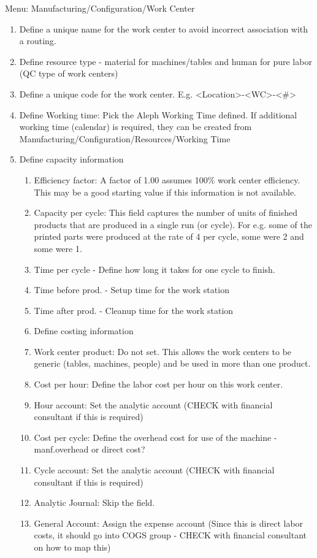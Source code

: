 Menu: Manufacturing/Configuration/Work Center

\begin{enumerate}
\item Define a unique name for the work center to avoid incorrect association with a routing.
\item Define resource type - material for machines/tables and human for pure labor (QC type of work centers)
\item Define a unique code for the work center. E.g. <Location>-<WC>-<\#>
\item Define Working time: Pick the Aleph Working Time defined. If additional working time (calendar) is required, they can be created from Manufacturing/Configuration/Resources/Working Time
\item Define capacity information
\begin{enumerate}
  \item Efficiency factor: A factor of 1.00 assumes 100\% work center efficiency. This may be a good starting value if this information is not available.
  \item Capacity per cycle: This field captures the number of units of finished products that are produced in a single run (or cycle). For e.g. some of the printed parts were produced at the rate of 4 per cycle, some were 2 and some were 1.
  \item Time per cycle - Define how long it takes for one cycle to finish.
  \item Time before prod. - Setup time for the work station
  \item Time after prod. - Cleanup time for the work station
  \item Define costing information
  \item Work center product: Do not set. This allows the work centers to be generic (tables, machines, people) and be used in more than one product.
  \item Cost per hour: Define the labor cost per hour on this work center. 
  \item  Hour account: Set the analytic account (CHECK with financial consultant if this is required)
  \item Cost per cycle: Define the overhead cost for use of the machine - manf.overhead or direct cost?
  \item Cycle account: Set the analytic account (CHECK with financial consultant if this is required)
  \item Analytic Journal: Skip the field.
  \item General Account: Assign the expense account (Since this is direct labor costs, it should go into COGS group - CHECK with financial consultant on how to map this)
  \end{enumerate}
\end{enumerate}

